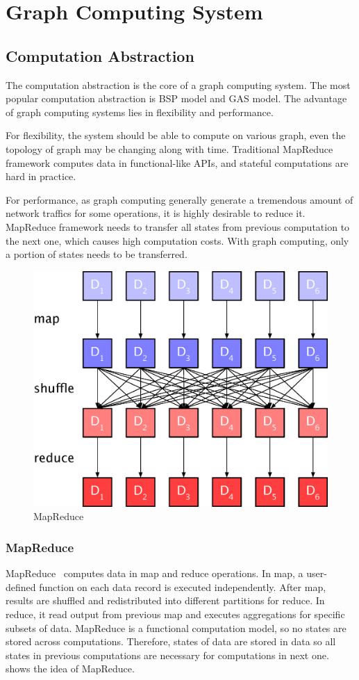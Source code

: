 \section{Graph Computing System} \label{component}
\subsection{Computation Abstraction}
The computation abstraction is the core of a graph computing system. The
most popular computation abstraction is BSP model and GAS model.
The advantage of graph computing systems lies in flexibility and performance.

For flexibility, the system should be able to compute on various
graph, even the topology of graph may be changing along with time.
Traditional MapReduce framework computes data in functional-like
APIs, and stateful computations are hard in practice. 

For performance, as graph computing generally generate a tremendous
amount of network traffics for some operations,
it is highly desirable to reduce it. MapReduce framework needs to transfer
all states from previous computation to the next one, which causes high computation
costs. With graph computing, only a portion of states needs to be transferred.

\begin{figure}[tbh]
  \center
  \includegraphics[width=.8\linewidth]{figures/mrmodel}
  \caption{MapReduce}
  \label{fig:mrmodel}
\end{figure}
\subsubsection{MapReduce}
MapReduce~\cite{mapreduce} computes data in map and reduce operations.
In map, a user-defined function on each data record is executed independently.
After map, results are shuffled and redistributed into different partitions
for reduce. In reduce, it read output from previous map and executes
aggregations for specific subsets of data. MapReduce is a functional
computation model, so no states are stored across computations.
Therefore, states of data are stored in data so all states
in previous computations are necessary
for computations in next one.  shows the idea of MapReduce.

